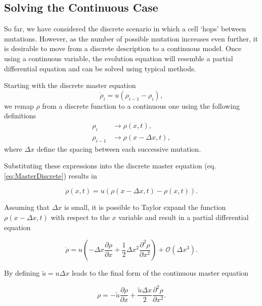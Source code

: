 \documentclass[12pt, a4paper,]{article}
\begin{document}
\subsection{Solving the Continuous Case}

So far, we have considered the discrete scenario in which a cell `hops' between mutations. However, as the number of possible mutation increases even further, it is desirable to move from a discrete description to a continuous model. Once using a continuous variable, the evolution equation will resemble a partial differential equation and can be solved using typical methods. 

Starting with the discrete master equation 
\begin{equation}
\dot{\rho } _i  = u ( \rho _{i-1}  - \rho _i ) , 
\label{eq:MasterDiscrete}
\end{equation}
we remap $\rho$ from a discrete function to a continuous one using the following definitions
\begin{align}
\rho _i & \rightarrow \rho (x, t), \\
\rho _{i-1} & \rightarrow \rho (x - \Delta x, t),
\end{align}
where $\Delta x$ define the spacing between each successive mutation.

Substituting these expressions into the discrete master equation (eq. \eqref{eq:MasterDiscrete}) results in

\begin{equation}
\dot{\rho}(x, t) = u ( \rho (x - \Delta x, t ) - \rho (x, t) ) .
\label{eq:MasterContinuous}
\end{equation}

Assuming that $\Delta x$ is small, it is possible to Taylor expand the function $\rho (x- \Delta x, t) $ with respect to the $x$ variable and result in a partial differential equation

\begin{equation}
\dot{\rho} = u \left( - \Delta x \frac{\partial \rho  }{\partial x} + \frac{1}{2} \Delta x ^2  \frac{\partial ^2 \rho  }{\partial x^2} \right)  + \mathcal{O} (\Delta x ^3 ).
\end{equation}

By defining $\tilde{u} = u \Delta x$ leads to the final form of the continuous master equation 

\begin{equation}
\dot{\rho} = - \tilde{u} \frac{\partial \rho}{\partial x} + \frac{\tilde{u} \Delta x}{2} \frac{\partial ^2 \rho}{\partial x^2}.
\label{eq:MasterContinuousFinal}
\end{equation}
 
\end{document}
